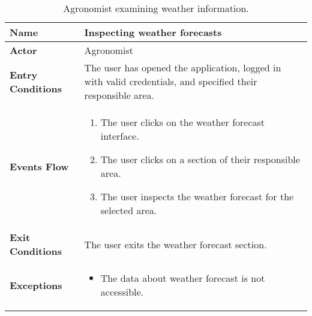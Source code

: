 \begin{table}[hbt!]
\centering
\small
\caption{\label{tab:agrWeather} Agronomist examining weather information.}
\renewcommand{\arraystretch}{1.25}
\begin{tabular}{|l|>{\raggedright\arraybackslash}m{12cm}|}
    \hline
    \textbf{Name} & Inspecting weather forecasts\\
    \hline
   	\textbf{Actor} & Agronomist\\
    \hline
    \textbf{Entry Conditions} & The user has opened the application, logged in with valid credentials, and specified their responsible area.\\    
    \hline
    \textbf{Events Flow} & 
    	\begin{enumerate}
            \item The user clicks on the weather forecast interface.
            \item The user clicks on a section of their responsible area.
            \item The user inspects the weather forecast for the selected area.
       \end{enumerate}\\
    \hline
    \textbf{Exit Conditions} & The user exits the weather forecast section.\\
    \hline
    \textbf{Exceptions} & 
    	\begin{itemize}
	    	\item The data about weather forecast is not accessible.
    	\end{itemize}\\
    \hline 
\end{tabular}
\end{table}
